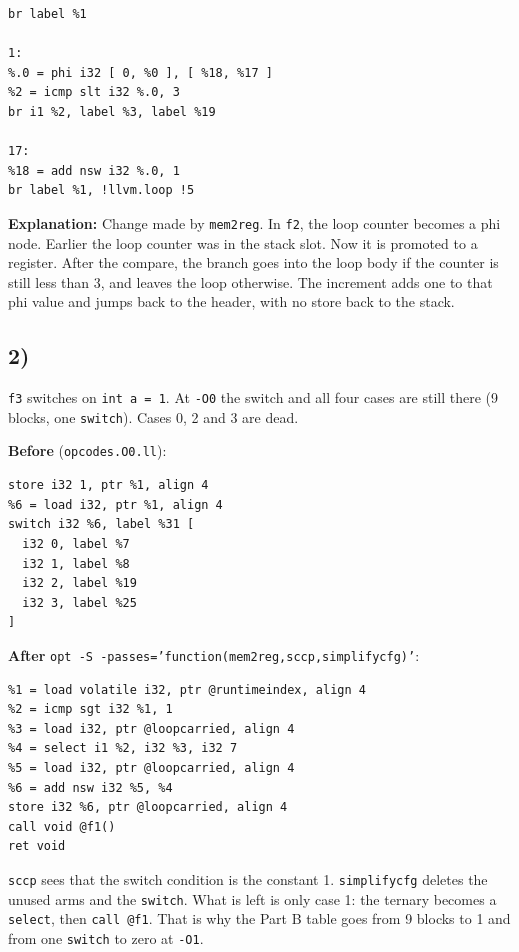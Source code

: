 \documentclass[11pt,a4paper]{article}
\begin{document}
\begin{lstlisting}
br label %1

1:
%.0 = phi i32 [ 0, %0 ], [ %18, %17 ]
%2 = icmp slt i32 %.0, 3
br i1 %2, label %3, label %19

17:
%18 = add nsw i32 %.0, 1
br label %1, !llvm.loop !5
\end{lstlisting}

\textbf{Explanation:} Change made by \texttt{mem2reg}. In \texttt{f2}, the loop
counter becomes a phi node. Earlier the loop counter was in the stack slot. Now
it is promoted to a register. After the compare, the branch goes into the
loop body if the counter is still less than 3, and leaves the loop otherwise.
The increment adds one to that phi value and jumps back to the header, with
no store back to the stack.

\subsection*{2)}

\texttt{f3} switches on \texttt{int a = 1}. At \texttt{-O0} the switch and
all four cases are still there (9 blocks, one \texttt{switch}). Cases 0, 2
and 3 are dead.

\textbf{Before} (\texttt{opcodes.O0.ll}):

\begin{lstlisting}
store i32 1, ptr %1, align 4
%6 = load i32, ptr %1, align 4
switch i32 %6, label %31 [
  i32 0, label %7
  i32 1, label %8
  i32 2, label %19
  i32 3, label %25
]
\end{lstlisting}

\textbf{After} \texttt{opt -S -passes='function(mem2reg,sccp,simplifycfg)'}:

\begin{lstlisting}
%1 = load volatile i32, ptr @runtimeindex, align 4
%2 = icmp sgt i32 %1, 1
%3 = load i32, ptr @loopcarried, align 4
%4 = select i1 %2, i32 %3, i32 7
%5 = load i32, ptr @loopcarried, align 4
%6 = add nsw i32 %5, %4
store i32 %6, ptr @loopcarried, align 4
call void @f1()
ret void
\end{lstlisting}

\texttt{sccp} sees that the switch condition is the constant 1.
\texttt{simplifycfg} deletes the unused arms and the \texttt{switch}.
What is left is only case 1: the ternary becomes a \texttt{select}, then
\texttt{call @f1}. That is why the Part B table goes from 9 blocks to 1
and from one \texttt{switch} to zero at \texttt{-O1}.
\end{document}
